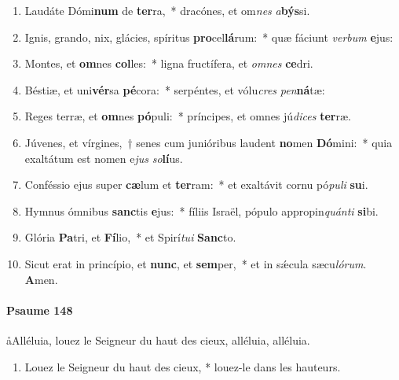 \documentclass[twoside]{article}
\begin{document}
\begin{paracol}[1]{2}
\begin{enumerate}[wide, itemsep=0mm, labelwidth=!, labelindent=0pt, label=\color{gregoriocolor}\theenumi]
\item Laudáte Dómi\textbf{num} de \textbf{ter}ra,~* dracónes, et om\textit{nes} \textit{a}\textbf{býs}si.

\item Ignis, grando, nix, glácies, spíritus \textbf{pro}cel\textbf{lá}rum:~* quæ fáciunt \textit{ver}\textit{bum} \textbf{e}jus:

\item Montes, et \textbf{om}nes \textbf{col}les:~* ligna fructífera, et \textit{om}\textit{nes} \textbf{ce}dri.

\item Béstiæ, et uni\textbf{vér}sa \textbf{pé}cora:~* serpéntes, et vólu\textit{cres} \textit{pen}\textbf{ná}tæ:

\item Reges terræ, et \textbf{om}nes \textbf{pó}puli:~* príncipes, et omnes jú\textit{di}\textit{ces} \textbf{ter}ræ.

\item Júvenes, et vírgines,~† senes cum junióribus laudent \textbf{no}men \textbf{Dó}mini:~* quia exaltátum est nomen e\textit{jus} \textit{so}\textbf{lí}us.

\item Conféssio ejus super \textbf{cæ}lum et \textbf{ter}ram:~* et exaltávit cornu pó\textit{pu}\textit{li} \textbf{su}i.

\item Hymnus ómnibus \textbf{sanc}tis \textbf{e}jus:~* fíliis Israël, pópulo appropin\textit{quán}\textit{ti} \textbf{si}bi.

\item Glória \textbf{Pa}tri, et \textbf{Fí}lio,~* et Spirí\textit{tu}\textit{i} \textbf{Sanc}to.

\item Sicut erat in princípio, et \textbf{nunc}, et \textbf{sem}per,~* et in sǽcula sæcu\textit{ló}\textit{rum}. \textbf{A}men.
\end{enumerate}

\switchcolumn

\paragraph{Psaume 148}
\aa Alléluia, louez le Seigneur du haut des cieux, alléluia, alléluia.


\begin{enumerate}[wide, itemsep=0mm, labelwidth=!, labelindent=0pt, label=\color{gregoriocolor}\theenumi]
\item Louez le Seigneur du haut des cieux, *
louez-le dans les hauteurs.


\end{enumerate}
\end{paracol}
\end{document}
